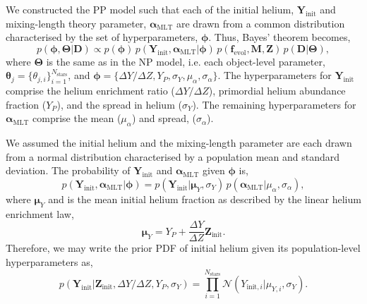 \documentclass[fleqn,usenatbib]{mnras}
\begin{document}
We constructed the PP model such that each of the initial helium, $\boldsymbol{Y}_\mathrm{init}$ and mixing-length theory parameter, $\boldsymbol{\alpha}_\mathrm{MLT}$ are drawn from a common distribution characterised by the set of hyperparameters, $\boldsymbol{\phi}$. Thus, Bayes' theorem becomes,
%
\begin{equation}
    p(\boldsymbol{\phi}, \boldsymbol{\Theta} | \boldsymbol{D}) \propto p(\boldsymbol{\phi}) \, p(\boldsymbol{Y}_\mathrm{init}, \boldsymbol{\alpha}_\mathrm{MLT} | \boldsymbol{\phi}) \, p(\boldsymbol{f}_{\mathrm{evol}}, \boldsymbol{M}, \boldsymbol{Z}) \, p(\boldsymbol{D} | \boldsymbol{\Theta}),
    \label{eq:hbmbayes}
\end{equation}
%
where $\boldsymbol{\Theta}$ is the same as in the NP model, i.e. each object-level parameter, $\boldsymbol{\theta}_j = \{\theta_{j, i}\}_{i=1}^{N_\mathrm{stars}}$, and $\boldsymbol{\phi} = \{\Delta Y/\Delta Z, Y_P, \sigma_Y, \mu_\alpha, \sigma_\alpha\}$. The hyperparameters for $\boldsymbol{Y}_\mathrm{init}$ comprise the helium enrichment ratio (${\Delta Y}/{\Delta Z}$), primordial helium abundance fraction ($Y_P$), and the spread in helium ($\sigma_Y$). The remaining hyperparameters for $\boldsymbol{\alpha}_\mathrm{MLT}$ comprise the mean ($\mu_\alpha$) and spread, ($\sigma_\alpha$).

We assumed the initial helium and the mixing-length parameter are each drawn from a normal distribution characterised by a population mean and standard deviation. The probability of $\boldsymbol{Y}_\mathrm{init}$ and $\boldsymbol{\alpha}_\mathrm{MLT}$ given $\boldsymbol{\phi}$ is,
%
\begin{equation}
    p(\boldsymbol{Y}_\mathrm{init}, \boldsymbol{\alpha}_\mathrm{MLT} | \boldsymbol{\phi}) = p(\boldsymbol{Y}_\mathrm{init} | \boldsymbol{\mu}_Y, \sigma_Y) \, p(\boldsymbol{\alpha}_\mathrm{MLT} | \mu_\alpha, \sigma_\alpha),
    \label{eq:ppool}
\end{equation}
%
where $\boldsymbol{\mu}_Y$ and is the mean initial helium fraction as described by the linear helium enrichment law,
%
\begin{equation}
    \boldsymbol{\mu}_{Y} = Y_P + \frac{\Delta Y}{\Delta Z} \boldsymbol{Z}_{\mathrm{init}}.\label{eq:helium}
\end{equation}
%
Therefore, we may write the prior PDF of initial helium given its population-level hyperparameters as,
%
\begin{equation}
    p(\boldsymbol{Y}_{\mathrm{init}} | \boldsymbol{Z}_{\mathrm{init}}, {\Delta Y}/{\Delta Z}, Y_P, \sigma_Y) = \prod_{i=1}^{N_\mathrm{stars}} \mathcal{N}({Y}_{\mathrm{init}, i} | {\mu}_{Y, i}, \sigma_Y).
\end{equation}
%
\end{document}
